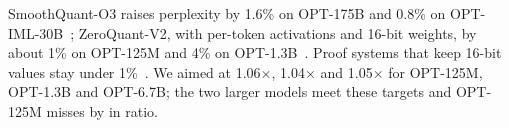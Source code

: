  SmoothQuant-O3 raises perplexity by 1.6\% on OPT-175B and 0.8\% on
OPT-IML-30B~\cite{xiao2023smoothquant}; ZeroQuant-V2, with per-token activations and 16-bit
weights, by about 1\% on OPT-125M and 4\% on OPT-1.3B~\cite{yao2023zeroquantv2}. Proof systems
that keep 16-bit values stay under 1\%~\cite{zkllm,zkgpt}. We aimed at 1.06$\times$, 1.04$\times$
and 1.05$\times$ for OPT-125M, OPT-1.3B and OPT-6.7B; the two larger models meet these targets and
OPT-125M misses by \QualityMissOptS{} in ratio.
